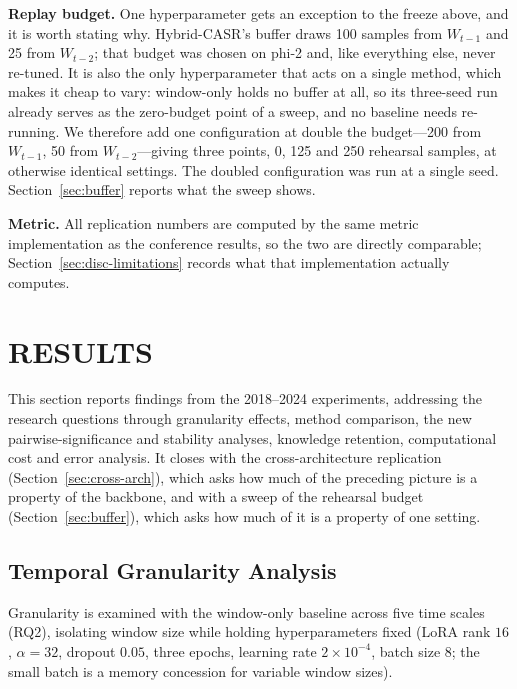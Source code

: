 \documentclass[a4paper,twoside]{article}
\begin{document}
\textbf{Replay budget.} One hyperparameter gets an exception to the freeze above, and it is worth stating why. Hybrid-CASR's buffer draws 100 samples from $W_{t-1}$ and 25 from $W_{t-2}$; that budget was chosen on phi-2 and, like everything else, never re-tuned. It is also the only hyperparameter that acts on a single method, which makes it cheap to vary: window-only holds no buffer at all, so its three-seed run already serves as the zero-budget point of a sweep, and no baseline needs re-running. We therefore add one configuration at double the budget---200 from $W_{t-1}$, 50 from $W_{t-2}$---giving three points, 0, 125 and 250 rehearsal samples, at otherwise identical settings. The doubled configuration was run at a single seed. Section~\ref{sec:buffer} reports what the sweep shows.

\textbf{Metric.} All replication numbers are computed by the same metric implementation as the conference results, so the two are directly comparable; Section~\ref{sec:disc-limitations} records what that implementation actually computes.

\section{\uppercase{Results}}
\label{sec:results}

\noindent
This section reports findings from the 2018--2024 experiments, addressing the research questions through granularity effects, method comparison, the new pairwise-significance and stability analyses, knowledge retention, computational cost and error analysis. It closes with the cross-architecture replication (Section~\ref{sec:cross-arch}), which asks how much of the preceding picture is a property of the backbone, and with a sweep of the rehearsal budget (Section~\ref{sec:buffer}), which asks how much of it is a property of one setting.

\subsection{Temporal Granularity Analysis}
\label{sec:granularity-results}

\noindent
Granularity is examined with the window-only baseline across five time scales (RQ2), isolating window size while holding hyperparameters fixed (LoRA rank $16$, $\alpha=32$, dropout $0.05$, three epochs, learning rate $2\times10^{-4}$, batch size 8; the small batch is a memory concession for variable window sizes).
\end{document}
